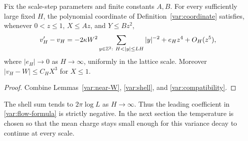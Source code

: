 \begin{proposition}\label{var:flow}
Fix the scale-step parameters and finite constants $A,B$.  For every
sufficiently large fixed $H$, the polynomial coordinate of
Definition~\ref{var:coordinate} satisfies, whenever
$0<z\le1$, $X\le Az$, and $Y\le Bz^2$,
\begin{equation}
 v'_H-v_H
 =-2\kappa W^2\sum_{y\in\Z^2:\ H<|y|\le LH}|y|^{-2}
   +e_Hz^4+O_H(z^5),
 \label{var:flow-formula}
\end{equation}
where $|e_H|\to0$ as $H\to\infty$, uniformly in the lattice scale.
Moreover $|v_H-W|\le C_HX^3$ for $X\le1$.
\end{proposition}
\begin{proof}
Combine Lemmas~\ref{var:near-W}, \ref{var:shell}, and
\ref{var:compatibility}.
\end{proof}

The shell sum tends to $2\pi\log L$ as $H\to\infty$.  Thus the
leading coefficient in \eqref{var:flow-formula} is strictly negative.
In the next section the temperature is chosen so that the mean charge
stays small enough for this variance decay to continue at every scale.
